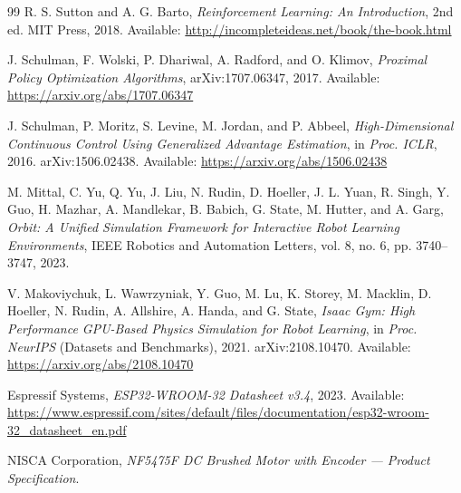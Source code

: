\begin{thebibliography}{99}
R. S. Sutton and A. G. Barto,
\textit{Reinforcement Learning: An Introduction}, 2nd ed.
MIT Press, 2018. Available: \url{http://incompleteideas.net/book/the-book.html}

J. Schulman, F. Wolski, P. Dhariwal, A. Radford, and O. Klimov,
\textit{Proximal Policy Optimization Algorithms},
arXiv:1707.06347, 2017. Available: \url{https://arxiv.org/abs/1707.06347}

J. Schulman, P. Moritz, S. Levine, M. Jordan, and P. Abbeel,
\textit{High-Dimensional Continuous Control Using Generalized Advantage Estimation},
in \textit{Proc. ICLR}, 2016.
arXiv:1506.02438. Available: \url{https://arxiv.org/abs/1506.02438}

M. Mittal, C. Yu, Q. Yu, J. Liu, N. Rudin, D. Hoeller, J. L. Yuan,
R. Singh, Y. Guo, H. Mazhar, A. Mandlekar, B. Babich, G. State, M. Hutter,
and A. Garg,
\textit{Orbit: A Unified Simulation Framework for Interactive Robot Learning Environments},
IEEE Robotics and Automation Letters, vol. 8, no. 6, pp. 3740--3747, 2023.

V. Makoviychuk, L. Wawrzyniak, Y. Guo, M. Lu, K. Storey, M. Macklin,
D. Hoeller, N. Rudin, A. Allshire, A. Handa, and G. State,
\textit{Isaac Gym: High Performance GPU-Based Physics Simulation for Robot Learning},
in \textit{Proc. NeurIPS} (Datasets and Benchmarks), 2021.
arXiv:2108.10470. Available: \url{https://arxiv.org/abs/2108.10470}

Espressif Systems,
\textit{ESP32-WROOM-32 Datasheet v3.4}, 2023.
Available: \url{https://www.espressif.com/sites/default/files/documentation/esp32-wroom-32_datasheet_en.pdf}

NISCA Corporation,
\textit{NF5475F DC Brushed Motor with Encoder — Product Specification}.

\end{thebibliography}
